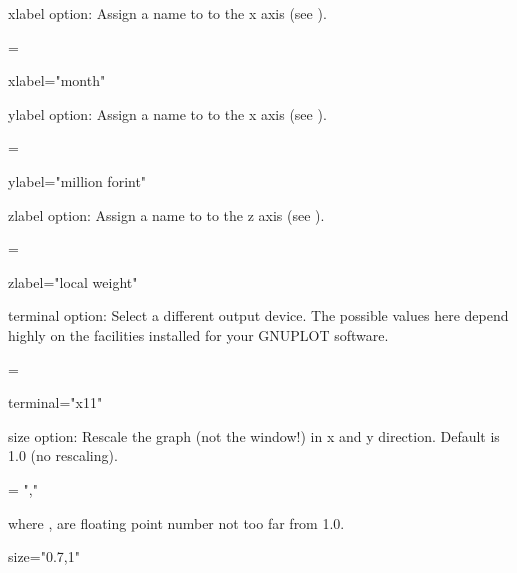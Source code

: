 \begin{Variable}{xlabel}
 option:
Assign a name to to the x axis (see ).

\begin{Syntax}
 = 
\end{Syntax}
\begin{Examples}
xlabel="month"\\
\end{Examples}
\end{Variable}

\begin{Variable}{ylabel}
 option:
Assign a name to to the x axis (see ).

\begin{Syntax}
 = 
\end{Syntax}
\begin{Examples}
ylabel="million forint"\\
\end{Examples}
\end{Variable}

\begin{Variable}{zlabel}
 option:
Assign a name to to the z axis (see ).

\begin{Syntax}
 = 
\end{Syntax}
\begin{Examples}
zlabel="local weight"\\
\end{Examples}
\end{Variable}

\begin{Variable}{terminal}
 option:
Select a different output device. The possible values here
depend highly on the facilities installed for your GNUPLOT
software.

\begin{Syntax}
 = 
\end{Syntax}
\begin{Examples}
terminal="x11"\\
\end{Examples}
\end{Variable}

\begin{Variable}{size}
 option:
Rescale the graph (not the window!) in x and y direction.
Default is 1.0 (no rescaling).

\begin{Syntax}
 = ","
\end{Syntax}
where , are floating point number not too
far from 1.0.
\begin{Examples}
size="0.7,1"\\
\end{Examples}
\end{Variable}

